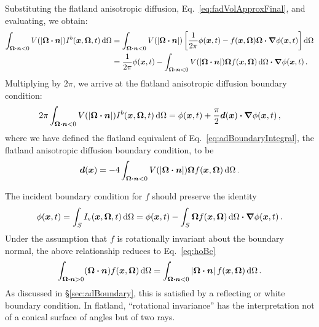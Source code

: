 Substituting the flatland anisotropic diffusion,
Eq.~\eqref{eq:fadVolApproxFinal}, and evaluating, we obtain:
\begin{align*}
\int_{\bm{\Omega}\bm{\cdot}\bm{n} < 0} V( \left| \bm{\Omega}\bm{\cdot}\bm{n} \right|)
I^b(\bm{x}, \bm{\Omega},t) \mathop{}\!\mathrm{d}\Omega
&=
\int_{\bm{\Omega}\bm{\cdot}\bm{n} < 0} V( \left| \bm{\Omega}\bm{\cdot}\bm{n} \right|)
\left[ \frac{1}{2\pi} \phi(\bm{x},t)
  - f(\bm{x}, \bm{\Omega}) \bm{\Omega}\bm{\cdot} \bm{\nabla} \phi(\bm{x},t)
 \right] \mathop{}\!\mathrm{d}\Omega
\\
&= 
 \frac{1}{2\pi} \phi(\bm{x},t)
 - \int_{\bm{\Omega}\bm{\cdot}\bm{n} < 0} V( \left| \bm{\Omega}\bm{\cdot}\bm{n} \right|) 
 \bm{\Omega} f(\bm{x}, \bm{\Omega})  \mathop{}\!\mathrm{d}\Omega 
 \bm{\cdot} \bm{\nabla} \phi(\bm{x},t) \,.
\end{align*}
Multiplying by $2\pi$, we arrive at the flatland anisotropic diffusion boundary
condition:
\begin{equation}\label{eq:flatAdBc}
2\pi \int_{\bm{\Omega}\bm{\cdot}\bm{n} < 0} V( \left| \bm{\Omega}\bm{\cdot}\bm{n} \right|)
I^b(\bm{x}, \bm{\Omega},t) \mathop{}\!\mathrm{d}\Omega
=
\phi(\bm{x},t)
+ \frac{\pi}{2} \bm{d}(\bm{x}) \bm{\cdot} \bm{\nabla} \phi(\bm{x},t)\,,
\end{equation}
where we have defined the flatland equivalent of
Eq.~\eqref{eq:adBoundaryIntegral}, the flatland anisotropic diffusion boundary
condition, to be
\begin{equation}\label{eq:flatAdBoundaryIntegral}
  \bm{d}(\bm{x}) = -4\int_{\bm{\Omega}\bm{\cdot}\bm{n} < 0}
  V(\left| \bm{\Omega}\bm{\cdot}\bm{n} \right|)
\bm{\Omega} f(\bm{x}, \bm{\Omega}) \mathop{}\!\mathrm{d}\Omega\,.
\end{equation}

The incident boundary condition for $f$ should preserve the identity
\begin{equation*}
  \phi(\bm{x},t) = \int_{S} I_\mathrm{v}(\bm{x},\bm{\Omega},t) \mathop{}\!\mathrm{d}\Omega
  = \phi(\bm{x},t) - \int_{S} \bm{\Omega} f(\bm{x},\bm{\Omega}) \mathop{}\!\mathrm{d}\Omega
  \bm{\cdot} \bm{\nabla} \phi(\bm{x},t) \,.
\end{equation*}
Under the assumption that $f$ is rotationally invariant about the
boundary normal, the above relationship reduces to Eq.~\eqref{eq:hoBc}
\begin{equation*}
  \int_{\bm{\Omega}\bm{\cdot}\bm{n} > 0} (\bm{\Omega}\bm{\cdot} \bm{n})
  f(\bm{x}, \bm{\Omega}) \mathop{}\!\mathrm{d}\Omega
  =
  \int_{\bm{\Omega}\bm{\cdot}\bm{n} < 0} \left| \bm{\Omega}\bm{\cdot} \bm{n} \right|
  f(\bm{x}, \bm{\Omega}) \mathop{}\!\mathrm{d}\Omega \,.
\end{equation*}
As discussed in \S\ref{sec:adBoundary}, this is satisfied by a reflecting or
white boundary condition. In flatland, ``rotational invariance'' has the
interpretation not of a conical surface of angles but of two rays.

